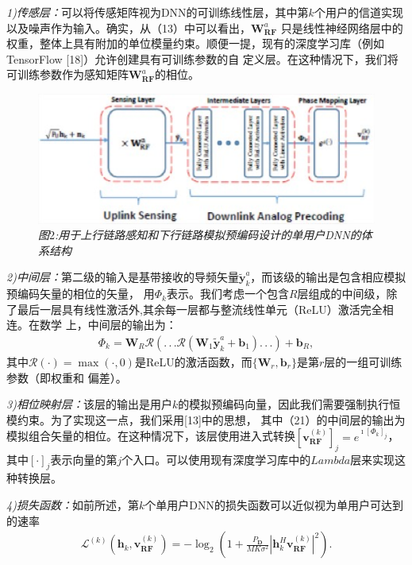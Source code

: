\documentclass[10pt,journal,final]{IEEEtran}%
\begin{document}
\textit{1)传感层：}可以将传感矩阵视为DNN的可训练线性层，其中第$k$个用户的信道实现以及噪声作为输入。确实，从（13）中可以看出，$\mathbf{W}_{\mathbf{RF}}^{a}$
只是线性神经网络层中的权重，整体上具有附加的单位模量约束。顺便一提，现有的深度学习库（例如TensorFlow [18]）允许创建具有可训练参数的自
定义层。在这种情况下，我们将可训练参数作为感知矩阵$\mathbf{W}_{\mathbf{RF}}^{a}$的相位。
\begin{figure}[H]
    \centering
    \includegraphics[scale=0.55]{2.eps}
    \caption*{\textit{\small{图}}\small{2}\textit{\small{:用于上行链路感知和下行链路模拟预编码设计的单用户DNN的体系结构}}}
\end{figure}
\vspace{-0.9em}
\textit{2)中间层：}第二级的输入是基带接收的导频矢量$\tilde{\mathbf{y}}_{k}^{a}$，而该级的输出是包含相应模拟预编码矢量的相位的矢量，
用$\Phi_{k}$表示。我们考虑一个包含$R$层组成的中间级，除了最后一层具有线性激活外,其余每一层都与整流线性单元（ReLU）激活完全相连。在数学
上，中间层的输出为：
\begin{align}
\Phi_{k}=\mathbf{W}_{R}\mathscr{R}(.\,.\,.\mathscr{R}(\mathbf{W}_{1}\tilde{\mathbf{y}}_{k}^{a}+\mathbf{b}_{1}).\,.\,.)+\mathbf{b}_{R},
\end{align}
其中$\mathscr{R}(\cdot)=\max(\cdot,0)$是ReLU的激活函数，而$\{\mathbf{W}_{r},\mathbf{b}_{r}\}$是第$r$层的一组可训练参数（即权重和
偏差）。

\textit{3)相位映射层：}该层的输出是用户$k$的模拟预编码向量，因此我们需要强制执行恒模约束。为了实现这一点，我们采用[13]中的思想，
其中（21）的中间层的输出为模拟组合矢量的相位。在这种情况下，该层使用进入式转换$[\mathbf{v}_{\mathbf{RF}}^{(k)}]_{j}=e^{\imath[\Phi_{k}]_{j}}$，
其中$[\cdot]_{j}$表示向量的第$j$个入口。可以使用现有深度学习库中的$Lambda$层来实现这种转换层。

\textit{4)损失函数：}如前所述，第$k$个单用户DNN的损失函数可以近似视为单用户可达到的速率
\begin{align}
\mathscr{L}^{(k)}(\mathbf{h}_{k},\mathbf{v}_{\mathbf{RF}}^{(k)})=-\log_{2}\left(1+\frac{P_{\mathbf{D}}}{MK\sigma^{2}} \left|\mathbf{h}_{k}^{H}\mathbf{v}_{\mathbf{RF}}^{(k)} \right|^{2} \right).
\end{align}
\vspace{-3.0em}
\end{document}

